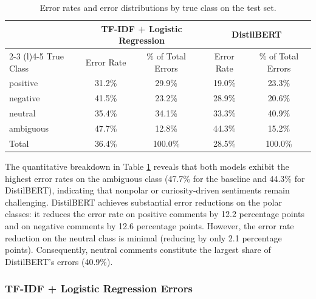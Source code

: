\documentclass[
  conference,
  letterpaper]{IEEEtran}
\begin{document}
\begin{table}[t]
\centering
\caption{Error rates and error distributions by true class on the test set.}
\footnotesize
\begin{tabular}{@{}lcccc@{}}
\toprule
& \multicolumn{2}{c}{TF-IDF + Logistic Regression} & \multicolumn{2}{c}{DistilBERT} \\
\cmidrule(r){2-3} \cmidrule(l){4-5}
True Class & Error Rate & \% of Total Errors & Error Rate & \% of Total Errors \\
\midrule
positive & 31.2\% & 29.9\% & 19.0\% & 23.3\% \\
negative & 41.5\% & 23.2\% & 28.9\% & 20.6\% \\
neutral & 35.4\% & 34.1\% & 33.3\% & 40.9\% \\
ambiguous & 47.7\% & 12.8\% & 44.3\% & 15.2\% \\
\midrule
Total & 36.4\% & 100.0\% & 28.5\% & 100.0\% \\
\bottomrule
\end{tabular}
\label{tab:error_stats}
\end{table}

The quantitative breakdown in Table \ref{tab:error_stats} reveals that
both models exhibit the highest error rates on the ambiguous class
(47.7\% for the baseline and 44.3\% for DistilBERT), indicating that
nonpolar or curiosity-driven sentiments remain challenging. DistilBERT
achieves substantial error reductions on the polar classes: it reduces
the error rate on positive comments by 12.2 percentage points and on
negative comments by 12.6 percentage points. However, the error rate
reduction on the neutral class is minimal (reducing by only 2.1
percentage points). Consequently, neutral comments constitute the
largest share of DistilBERT's errors (40.9\%).

\subsubsection{TF-IDF + Logistic Regression
Errors}\label{tf-idf-logistic-regression-errors}
\end{document}

